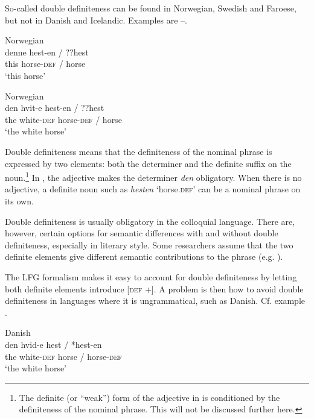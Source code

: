 \documentclass[output=paper,hidelinks]{langscibook}
\begin{document}
So-called double definiteness can be found in Norwegian, Swedish and Faroese, but not in Danish and Icelandic. Examples are --.



\ea\label{ex:Scandinavian:96} Norwegian\\
\gll
 {denne} {hest-en} {/} {??hest}\\
 this horse-\textsc{def} \textsc{/} \phantom{??}horse\\
\glt `this horse' \z



\ea\label{ex:Scandinavian:97} Norwegian\\
\gll
 {den} {hvit-e} {hest-en} {/} {??hest}\\
 the white-\textsc{def} horse-\textsc{def} \textsc{/} \phantom{??}horse\\
\glt `the white horse' \z

\noindent Double definiteness means that the definiteness of the nominal phrase is expressed by two elements: both the determiner and the definite suffix on the noun.\footnote{The definite (or ``weak'') form of the adjective in  is conditioned by the definiteness of the nominal phrase. This will not be discussed further here.} In , the adjective makes the determiner \textit{den} obligatory. When there is no adjective, a definite noun such as \textit{hesten} `horse.\textsc{def'} can be a nominal phrase on its own.

 Double definiteness is usually obligatory in the colloquial language. There are, however, certain options for semantic differences with and without double definiteness, especially in literary style. Some researchers assume that the two definite elements give different semantic contributions to the phrase (e.g. \citealt[35--44]{Julien05}).

 The LFG formalism makes it easy to account for double definiteness by letting both definite elements introduce [\textsc{def} +]. A problem is then how to avoid double definiteness in languages where it is ungrammatical, such as Danish. Cf. example .



\ea\label{ex:Scandinavian:98} Danish\\
\gll
 {den} {hvid-e} {hest} {/} {*hest-en}\\
 the white-\textsc{def} horse / \phantom{*}horse-\textsc{def}\\
\glt `the white horse' \z
\end{document}
